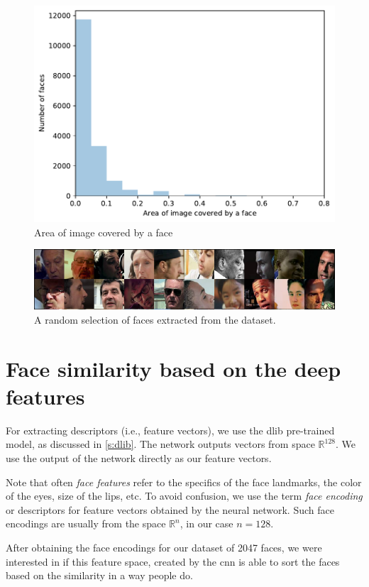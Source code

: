 \begin{figure}
    \centering
    \includegraphics[width=0.7\linewidth]{graphs/faces_size_distribution.pdf}
    \caption{Area of image covered by a face}
    \label{fig:faces_size_distribution}
\end{figure}

\begin{figure}
    \centering
    \includegraphics[width=0.98\linewidth]{img/random_selection_faces.pdf}
    \caption{A random selection of faces extracted from the dataset.}
    \label{fig:random_selection_faces}
\end{figure}

\section{Face similarity based on the deep features}

For extracting descriptors (i.e., feature vectors), we use the dlib pre-trained model, as discussed in \ref{s:dlib}. The network outputs vectors from space $\mathbb{R}^{128}$. We use the output of the network directly as our feature vectors. 

Note that often \emph{face features} refer to the specifics of the face landmarks, the color of the eyes, size of the lips, etc. To avoid confusion, we use the term \emph{face encoding} or descriptors for feature vectors obtained by the neural network. Such face encodings are usually from the space $\mathbb{R}^n$, in our case $n=128$.

After obtaining the face encodings for our dataset of 2047 faces, we were interested in if this feature space, created by the \acrshort{cnn} is able to sort the faces based on the similarity in a way people do. 


